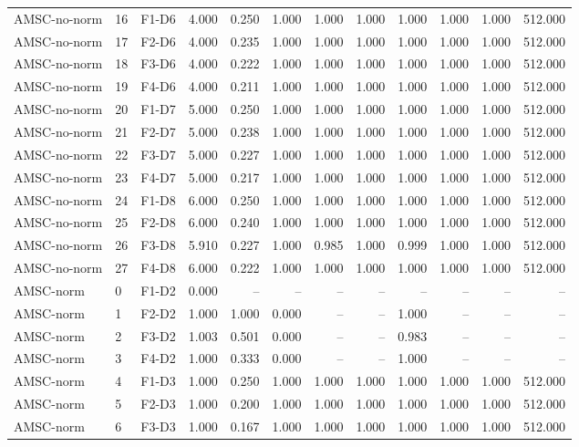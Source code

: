 \begin{table}[ht]
\begin{tabular}{lllrrrrrrrrr}
AMSC-no-norm & 16 & F1-D6 & 4.000 & 0.250 & 1.000 & 1.000 & 1.000 & 1.000 & 1.000 & 1.000 & 512.000 \\
AMSC-no-norm & 17 & F2-D6 & 4.000 & 0.235 & 1.000 & 1.000 & 1.000 & 1.000 & 1.000 & 1.000 & 512.000 \\
AMSC-no-norm & 18 & F3-D6 & 4.000 & 0.222 & 1.000 & 1.000 & 1.000 & 1.000 & 1.000 & 1.000 & 512.000 \\
AMSC-no-norm & 19 & F4-D6 & 4.000 & 0.211 & 1.000 & 1.000 & 1.000 & 1.000 & 1.000 & 1.000 & 512.000 \\
AMSC-no-norm & 20 & F1-D7 & 5.000 & 0.250 & 1.000 & 1.000 & 1.000 & 1.000 & 1.000 & 1.000 & 512.000 \\
AMSC-no-norm & 21 & F2-D7 & 5.000 & 0.238 & 1.000 & 1.000 & 1.000 & 1.000 & 1.000 & 1.000 & 512.000 \\
AMSC-no-norm & 22 & F3-D7 & 5.000 & 0.227 & 1.000 & 1.000 & 1.000 & 1.000 & 1.000 & 1.000 & 512.000 \\
AMSC-no-norm & 23 & F4-D7 & 5.000 & 0.217 & 1.000 & 1.000 & 1.000 & 1.000 & 1.000 & 1.000 & 512.000 \\
AMSC-no-norm & 24 & F1-D8 & 6.000 & 0.250 & 1.000 & 1.000 & 1.000 & 1.000 & 1.000 & 1.000 & 512.000 \\
AMSC-no-norm & 25 & F2-D8 & 6.000 & 0.240 & 1.000 & 1.000 & 1.000 & 1.000 & 1.000 & 1.000 & 512.000 \\
AMSC-no-norm & 26 & F3-D8 & 5.910 & 0.227 & 1.000 & 0.985 & 1.000 & 0.999 & 1.000 & 1.000 & 512.000 \\
AMSC-no-norm & 27 & F4-D8 & 6.000 & 0.222 & 1.000 & 1.000 & 1.000 & 1.000 & 1.000 & 1.000 & 512.000 \\
AMSC-norm & 0 & F1-D2 & 0.000 & -- & -- & -- & -- & -- & -- & -- & -- \\
AMSC-norm & 1 & F2-D2 & 1.000 & 1.000 & 0.000 & -- & -- & 1.000 & -- & -- & -- \\
AMSC-norm & 2 & F3-D2 & 1.003 & 0.501 & 0.000 & -- & -- & 0.983 & -- & -- & -- \\
AMSC-norm & 3 & F4-D2 & 1.000 & 0.333 & 0.000 & -- & -- & 1.000 & -- & -- & -- \\
AMSC-norm & 4 & F1-D3 & 1.000 & 0.250 & 1.000 & 1.000 & 1.000 & 1.000 & 1.000 & 1.000 & 512.000 \\
AMSC-norm & 5 & F2-D3 & 1.000 & 0.200 & 1.000 & 1.000 & 1.000 & 1.000 & 1.000 & 1.000 & 512.000 \\
AMSC-norm & 6 & F3-D3 & 1.000 & 0.167 & 1.000 & 1.000 & 1.000 & 1.000 & 1.000 & 1.000 & 512.000 \\

\end{tabular}
\end{table}
